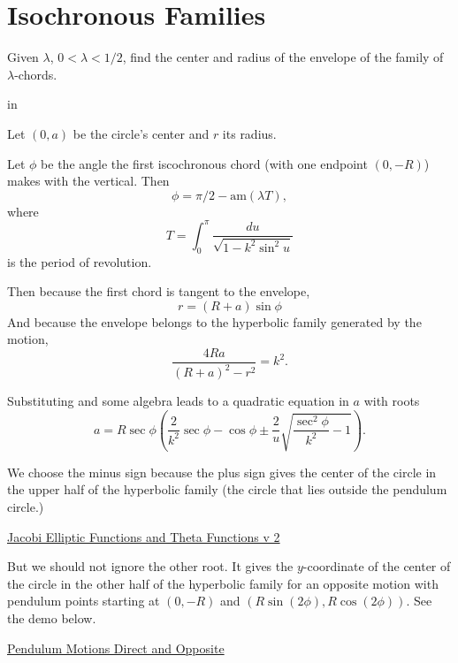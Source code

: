 \documentclass{ximera}
\newcommand{\pskip}{\vskip 0.1 in}
\begin{document}
\section*{Isochronous Families}

\begin{exploration}

Given $\lambda$, $0 < \lambda < 1/2$, find the center and radius of the envelope of the family of $\lambda$-chords. 

\pskip

Let $(0,a)$ be the circle's center and $r$ its radius.

Let $\phi$ be the angle the first iscochronous chord (with one endpoint $(0,-R)$) makes with the vertical. Then
\[
      \phi = \pi/2 - \text{am}(\lambda T) ,
\]
where
\[
  T = \int_0^{\pi} \frac{du}{\sqrt{1-k^2\sin^2 u}}
\] 
is the period of revolution.

Then because the first chord is tangent to the envelope,
\[
     r = (R+a) \sin \phi
\]
And because the envelope belongs to the hyperbolic family generated by the motion,
\[
  \frac{4Ra}{(R+a)^2 - r^2} = k^2 .
\]

Substituting and some algebra leads to a quadratic equation in $a$ with roots
\[
  a =   R \sec \phi \left( \frac{2}{k^2} \sec \phi - \cos\phi \pm   \frac{2}{u} \sqrt{\frac{\sec^2\phi}{k^2} - 1}   \right) .
\]

We choose the minus sign because the plus sign gives the center of the circle in the upper half of the hyperbolic family (the circle that lies outside the pendulum circle.)



\begin{onlineOnly}
    \begin{center}
\end{center}
\end{onlineOnly}

\href{https://www.desmos.com/calculator/svb8pwijet}{Jacobi Elliptic Functions and Theta Functions v 2}

But we should not ignore the other root. It gives the $y$-coordinate of the center of the circle in the other half of the hyperbolic family for an opposite motion with pendulum points starting at $(0,-R)$ and $(R\sin(2\phi),R\cos(2\phi))$. See the demo below.

\begin{onlineOnly}
    \begin{center}
\end{center}
\end{onlineOnly}

\href{https://www.desmos.com/calculator/swzgtt3nup}{Pendulum Motions Direct and Opposite}


\end{exploration}
\end{document}
